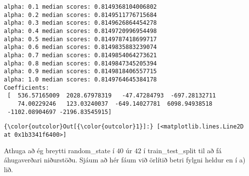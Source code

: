 \documentclass[11pt]{article}
\begin{document}
    \begin{Verbatim}[commandchars=\\\{\}]
alpha: 0.1 median scores: 0.8149368104006802
alpha: 0.2 median scores: 0.8149511776715684
alpha: 0.3 median scores: 0.8149626864454278
alpha: 0.4 median scores: 0.8149720996954498
alpha: 0.5 median scores: 0.8149787418699717
alpha: 0.6 median scores: 0.8149835883239074
alpha: 0.7 median scores: 0.8149854064273621
alpha: 0.8 median scores: 0.8149847345205394
alpha: 0.9 median scores: 0.8149818406557715
alpha: 1.0 median scores: 0.8149764645384178
Coefficients: 
 [  536.57165009  2028.67978319   -47.47284793  -697.28132711
    74.00229246   123.03240037  -649.14027781  6098.94938518
 -1102.08904697 -2196.83545915]

    \end{Verbatim}

\begin{Verbatim}[commandchars=\\\{\}]
{\color{outcolor}Out[{\color{outcolor}1}]:} [<matplotlib.lines.Line2D at 0x1b3341f6400>]
\end{Verbatim}
            
    Athuga að ég breytti random\_state í \(40\) úr \(42\) í
train\_test\_split til að fá áhugaverðari niðurstöðu. Sjáum að hér fáum
við örlítið betri fylgni heldur en í a) lið.


    
    
    
    
\end{document}
